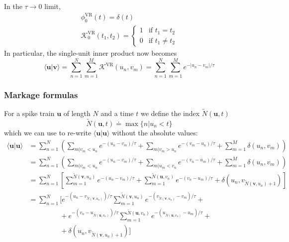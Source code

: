 \documentclass[11pt,a4paper]{article}
\newcommand{\abs}[1]{\left\vert #1 \right\vert}
\newcommand{\braket}[2]{\langle #1|#2 \rangle}
\newcommand{\bu}{\boldsymbol{u}}
\newcommand{\bv}{\boldsymbol{v}}
\newcommand{\Nmax}[2]{\tilde{N}\left( #1, #2\right)}
\begin{document}
In the $\tau\rightarrow 0$ limit,
\begin{gather*}
\phi^{\textrm{VR}}_{0}(t) = \delta(t)\\
\mathcal{K}^{\textrm{VR}}_{0}(t_1,t_2) = \begin{cases}
  1 & \textrm{if } t_1=t_2\\
  0 & \textrm{if } t_1\neq t_2
\end{cases}
\end{gather*}
In particular, the single-unit inner product now becomes
\begin{equation*}
  \braket{\bu}{\bv} = \sum_{n=1}^N\sum_{m=1}^M
  \mathcal{K}^{\textrm{VR}}(u_n,v_m) = \sum_{n=1}^N\sum_{m=1}^M
  e^{-\abs{u_n-v_m}/\tau}
\end{equation*}

\subsubsection{Markage formulas}
For a spike train $\bu$ of length $N$ and a time $t$ we define
the index $\Nmax{\bu}{t}$
\begin{equation*}
  \Nmax{\bu}{t} \doteq \max\{n | u_n < t\}
\end{equation*}
which we can use to re-write $\braket{\bu}{\bu}$ without the absolute
values:
\begin{equation*}
  \begin{split}
    \braket{\bu}{\bu}&= \sum_{n=1}^N \left(
      \sum_{m|v_m<u_n}e^{-(u_n-v_m)/\tau} +
      \sum_{m|v_m>u_n}e^{-(v_m-u_n)/\tau} +
      \sum_{m=1}^M\delta\left(u_n,v_m\right)
    \right)\\
    &= \sum_{n=1}^N \left( \sum_{m|v_m<u_n}e^{-(u_n-v_m)/\tau} +
      \sum_{m|u_m<v_n}e^{-(v_n-u_m)/\tau} +
      \sum_{m=1}^M\delta\left(u_n,v_m\right) \right)\\
    &= \sum_{n=1}^N \left[
      \sum_{m=1}^{\Nmax{\bv}{u_n}}e^{-(u_n-v_m)/\tau} +
      \sum_{m=1}^{\Nmax{\bu}{v_n}}e^{-(v_n-u_m)/\tau} +
      \delta\left(u_n,v_{\Nmax{\bv}{u_n}+1}\right)
    \right]\\
    &= \sum_{n=1}^N \Bigg[ e^{-(u_n-v_{\Nmax{\bv}{u_n}})/\tau}
    \sum_{m=1}^{\Nmax{\bv}{u_n}}e^{-(v_{\Nmax{\bv}{u_n}}-v_m)/\tau} +
    \\
    &\phantom{ = \sum_{n=1}^N } + e^{-(v_n-u_{\Nmax{\bu}{v_n}})/\tau}
    \sum_{m=1}^{\Nmax{\bu}{v_n}}e^{-(u_{\Nmax{\bu}{v_n}}-u_m)/\tau}
    + \\
    &\phantom{ = \sum_{n=1}^N } + \delta\left(u_n,v_{\Nmax{\bv}{u_n}+1}\right) \Bigg]\\
  \end{split}
\end{equation*}
\end{document}
